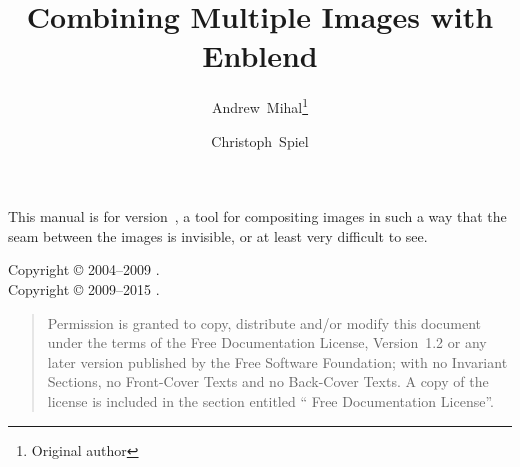 

\begin{titlepage}
  \renewcommand{\thefootnote}{\fnsymbol{footnote}}

  \author{Andrew~Mihal\footnote{Original author} \and Christoph~Spiel}

  \title{Combining Multiple Images with Enblend }

  \date{}

  \maketitle
\end{titlepage}


\vspace*{\fill}
\ifhevea
  \relax
\else
  \begin{center}\end{center}
\fi

\label{sec:abstract}\noindent This manual is for \App{}
version~, a tool for compositing images in such a way that the seam between the
images is invisible, or at least very difficult to see.

\vspace*{\fill}

\begin{flushleft}
  Copyright \copyright{} 2004--2009 . \\
  Copyright \copyright{} 2009--2015 .
\end{flushleft}

\begin{quotation}
  \noindent Permission is granted to copy, distribute and/or modify this document under the
  terms of the  Free Documentation License, Version~1.2 or any later version
  published by the Free Software Foundation; with no Invariant Sections, no Front-Cover Texts
  and no Back-Cover Texts.  A copy of the license is included in the section entitled
  `` Free Documentation License''.
\end{quotation}

\cleardoublepage{}


